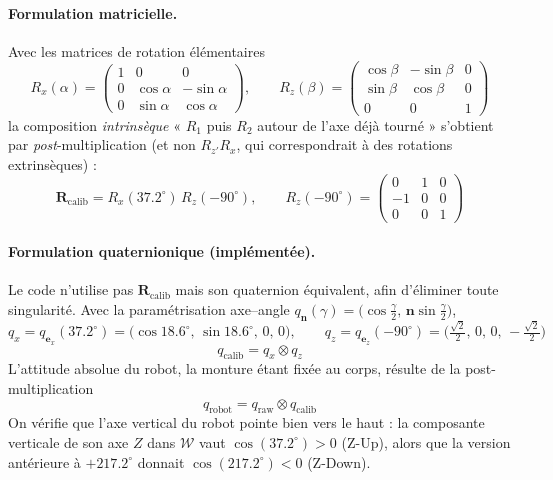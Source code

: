 \documentclass{tropLaClasse}
\begin{document}
\paragraph{Formulation matricielle.}
Avec les matrices de rotation élémentaires
\begin{equation}
R_x(\alpha)=\begin{pmatrix}1&0&0\\0&\cos\alpha&-\sin\alpha\\0&\sin\alpha&\cos\alpha\end{pmatrix},
\qquad
R_z(\beta)=\begin{pmatrix}\cos\beta&-\sin\beta&0\\\sin\beta&\cos\beta&0\\0&0&1\end{pmatrix}
\end{equation}
la composition \emph{intrinsèque} « $R_1$ puis $R_2$ autour de l'axe déjà tourné » s'obtient par \emph{post}-multiplication (et non $R_{z'}R_x$, qui correspondrait à des rotations extrinsèques) :
\begin{equation}
\mathbf{R}_{\text{calib}}=R_x(37{.}2^\circ)\,R_z(-90^\circ),
\qquad
R_z(-90^\circ)=\begin{pmatrix}0&1&0\\-1&0&0\\0&0&1\end{pmatrix}
\label{eq:Rcalib}
\end{equation}

\paragraph{Formulation quaternionique (implémentée).}
Le code n'utilise pas $\mathbf{R}_{\text{calib}}$ mais son quaternion équivalent, afin d'éliminer toute singularité. Avec la paramétrisation axe--angle $q_{\mathbf{n}}(\gamma)=\big(\cos\tfrac{\gamma}{2},\,\mathbf{n}\sin\tfrac{\gamma}{2}\big)$,
\begin{equation}
q_x=q_{\mathbf{e}_x}(37{.}2^\circ)=\big(\cos 18{.}6^\circ,\,\sin 18{.}6^\circ,\,0,\,0\big),
\qquad
q_z=q_{\mathbf{e}_z}(-90^\circ)=\Big(\tfrac{\sqrt{2}}{2},\,0,\,0,\,-\tfrac{\sqrt{2}}{2}\Big)
\end{equation}
\begin{equation}
\boxed{\,q_{\text{calib}}=q_x\otimes q_z\,}
\label{eq:qcalib}
\end{equation}
L'attitude absolue du robot, la monture étant fixée au corps, résulte de la post-multiplication
\begin{equation}
\boxed{\,q_{\text{robot}}=q_{\text{raw}}\otimes q_{\text{calib}}\,}
\label{eq:qrobot}
\end{equation}
On vérifie que l'axe vertical du robot pointe bien vers le haut : la composante verticale de son axe $Z$ dans $\mathcal W$ vaut $\cos(37{.}2^\circ)>0$ (Z-Up), alors que la version antérieure à $+217{.}2^\circ$ donnait $\cos(217{.}2^\circ)<0$ (Z-Down).
\end{document}
